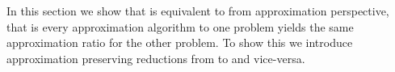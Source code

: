 In this section we show that \Prob{} is equivalent to \ProbGroup{} from 
approximation perspective, 
that is every approximation algorithm to one problem yields the same approximation 
ratio for the other problem.
To show this we introduce approximation preserving reductions from \Prob{} to \ProbGroup{}
and vice-versa. 


